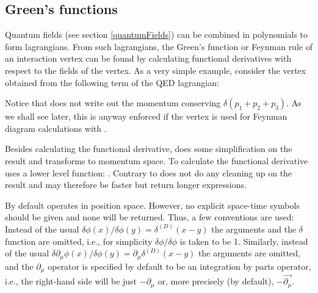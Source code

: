 \subsection{Green's functions}
\label{Green}

Quantum fields (see section \ref{quantumFields}) can be combined in polynomials to form lagrangians. From such lagrangians, the Green's function or Feynman rule of an interaction vertex can be found by calculating functional derivatives with respect to the fields of the vertex. As a very simple example, consider the vertex obtained from the following term of the QED lagrangian:

\beom
{}
\enom

Notice that  does not write out the momentum conserving $\delta(p_1+p_2+p_3)$. As we shall see later, this is anyway enforced if the vertex is used for Feynman diagram calculations with \fa.

Besides calculating the functional derivative,  does some simplification on the result and transforms to momentum space. To calculate the functional derivative  uses a lower level function: . Contrary to   does not do any cleaning up on the result and may therefore be faster but return longer expressions.

By default  operates in position space. However, no explicit space-time symbols should be given and none will be returned. Thus, a few conventions are used: Instead of the usual $\delta \phi(x)/\delta \phi(y) = \delta^{(D)}(x-y)$ the arguments and the $\delta$ function are omitted, i.e., for simplicity $\delta \phi/\delta \phi$ is taken to be 1. Similarly, instead of the usual $\delta \partial_\mu \phi(x)/\delta \phi(y) = \partial_\mu  \delta^{(D)}(x-y)$ the arguments are omitted, and the $\partial_\mu$ operator is specified by default to be an integration by parts operator, i.e., the right-hand side will be just $-\partial_\mu$ or, more precisely (by default), $-\overrightarrow{\partial_\mu}$.

